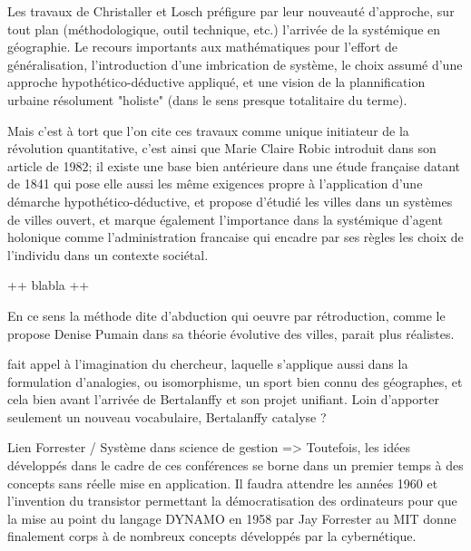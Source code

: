{Les travaux de Christaller et Losch préfigure par leur nouveauté d'approche, sur tout plan (méthodologique, outil technique, etc.) l'arrivée de la systémique en géographie. Le recours importants aux mathématiques pour l'effort de généralisation, l'introduction d'une imbrication de système, le choix assumé d'une approche hypothético-déductive appliqué, et une vision de la plannification urbaine résolument "holiste" (dans le sens presque totalitaire du terme).

Mais c'est à tort que l'on cite ces travaux comme unique initiateur de la révolution quantitative, c'est ainsi que Marie Claire Robic \autocite{Robic1982} introduit dans son article de 1982; il existe une base bien antérieure dans une étude française datant de 1841 qui pose elle aussi les même exigences propre à l'application d'une démarche hypothético-déductive, et propose d'étudié les villes dans un systèmes de villes ouvert, et marque également l'importance dans la systémique d'agent holonique comme l'administration francaise qui encadre par ses règles les choix de l'individu dans un contexte sociétal. 





++ blabla ++

En ce sens la méthode dite d'abduction qui oeuvre par rétroduction, comme le propose Denise Pumain dans sa théorie évolutive des villes, parait plus réalistes.

fait appel à l'imagination du chercheur, laquelle s'applique aussi dans la formulation d'analogies, ou isomorphisme, un sport bien connu des géographes, et cela bien avant l'arrivée de Bertalanffy et son projet unifiant. 
Loin d'apporter seulement un nouveau vocabulaire, Bertalanffy catalyse ?





Lien Forrester / Système dans science de gestion => Toutefois, les idées développés dans le cadre de ces conférences se borne dans un premier temps à des concepts sans réelle mise en application. Il faudra attendre les années 1960 et l'invention du transistor permettant la démocratisation des ordinateurs pour que la mise au point du langage DYNAMO en 1958 par Jay Forrester au MIT donne finalement corps à de nombreux concepts développés par la cybernétique.

}
